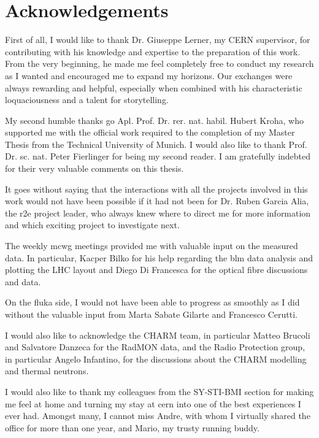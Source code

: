 \documentclass[encoding=utf8,british]{tumphthesis}
\begin{document}
\backmatter



\printbibliography

\printglossary[type=\acronymtype, title=List of Abbreviations, toctitle=List of Abbreviations]


\chapter*{Acknowledgements}
First of all, I would like to thank Dr. Giuseppe Lerner, my CERN supervisor, for contributing with his knowledge and expertise to the preparation of this work. From the very beginning, he made me feel completely free to conduct my research as I wanted and encouraged me to expand my horizons. Our exchanges were always rewarding and helpful, especially when combined with his characteristic loquaciousness and a talent for storytelling.

My second humble thanks go Apl. Prof. Dr. rer. nat. habil. Hubert Kroha, who supported me with the official work required to the completion of my Master Thesis from the Technical University of Munich. I would also like to thank Prof. Dr. sc. nat. Peter Fierlinger for being my second reader. I am gratefully indebted for their very valuable comments on this thesis.

It goes without saying that the interactions with all the projects involved in this work would not have been possible if it had not been for Dr. Ruben Garcia Alia, the \acrshort{r2e} project leader, who always knew where to direct me for more information and which exciting project to investigate next. 

The weekly \acrshort{mcwg} meetings provided me with valuable input on the measured data. In particular, Kacper Bilko for his help regarding the \acrshort{blm} data analysis and plotting the LHC layout and Diego Di Francesca for the optical fibre discussions and data. 

On the \acrshort{fluka} side, I would not have been able to progress as smoothly as I did without the valuable input from Marta Sabate Gilarte and Francesco Cerutti.

I would also like to acknowledge the CHARM team, in particular Matteo Brucoli and Salvatore Danzeca for the RadMON data, and the Radio Protection group, in particular Angelo Infantino, for the discussions about the CHARM modelling and thermal neutrons.

I would also like to thank my colleagues from the SY-STI-BMI section for making me feel at home and turning my stay at \acrshort{cern} into one of the best experiences I ever had. Amongst many, I cannot miss Andre, with whom I virtually shared the office for more than one year, and Mario, my trusty running buddy.
\end{document}
